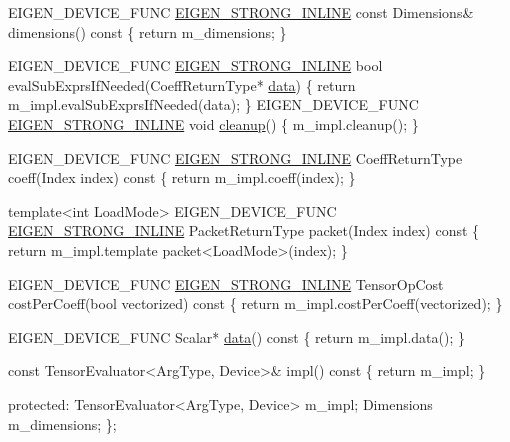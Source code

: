 \begin{DoxyCodeInclude}
  EIGEN\_DEVICE\_FUNC \hyperlink{eigen_2_eigen_2src_2_core_2util_2_macros_8h_af2b60117c00a6e75812de43bfe7db3b1}{EIGEN\_STRONG\_INLINE} \textcolor{keyword}{const} Dimensions& dimensions()\textcolor{keyword}{ const }\{ \textcolor{keywordflow}{return} 
      m\_dimensions; \}

  EIGEN\_DEVICE\_FUNC \hyperlink{eigen_2_eigen_2src_2_core_2util_2_macros_8h_af2b60117c00a6e75812de43bfe7db3b1}{EIGEN\_STRONG\_INLINE} \textcolor{keywordtype}{bool} evalSubExprsIfNeeded(CoeffReturnType* 
      \hyperlink{eigen_2doc_2snippets_2_map__placement__new_8cpp_a0673c926a80474ab7c893cf9a065d0a6}{data}) \{
    \textcolor{keywordflow}{return} m\_impl.evalSubExprsIfNeeded(data);
  \}
  EIGEN\_DEVICE\_FUNC \hyperlink{eigen_2_eigen_2src_2_core_2util_2_macros_8h_af2b60117c00a6e75812de43bfe7db3b1}{EIGEN\_STRONG\_INLINE} \textcolor{keywordtype}{void} \hyperlink{visual__studio_2zlib_2examples_2enough_8c_a0a65638f703cc409774d70ceab9c9c62}{cleanup}() \{
    m\_impl.cleanup();
  \}

  EIGEN\_DEVICE\_FUNC \hyperlink{eigen_2_eigen_2src_2_core_2util_2_macros_8h_af2b60117c00a6e75812de43bfe7db3b1}{EIGEN\_STRONG\_INLINE} CoeffReturnType coeff(Index index)\textcolor{keyword}{ const}
\textcolor{keyword}{  }\{
    \textcolor{keywordflow}{return} m\_impl.coeff(index);
  \}

  \textcolor{keyword}{template}<\textcolor{keywordtype}{int} LoadMode>
  EIGEN\_DEVICE\_FUNC \hyperlink{eigen_2_eigen_2src_2_core_2util_2_macros_8h_af2b60117c00a6e75812de43bfe7db3b1}{EIGEN\_STRONG\_INLINE} PacketReturnType packet(Index index)\textcolor{keyword}{ const}
\textcolor{keyword}{  }\{
    \textcolor{keywordflow}{return} m\_impl.template packet<LoadMode>(index);
  \}

  EIGEN\_DEVICE\_FUNC \hyperlink{eigen_2_eigen_2src_2_core_2util_2_macros_8h_af2b60117c00a6e75812de43bfe7db3b1}{EIGEN\_STRONG\_INLINE} TensorOpCost costPerCoeff(\textcolor{keywordtype}{bool} vectorized)\textcolor{keyword}{ const
       }\{
    \textcolor{keywordflow}{return} m\_impl.costPerCoeff(vectorized);
  \}

  EIGEN\_DEVICE\_FUNC Scalar* \hyperlink{eigen_2doc_2snippets_2_map__placement__new_8cpp_a0673c926a80474ab7c893cf9a065d0a6}{data}()\textcolor{keyword}{ const }\{ \textcolor{keywordflow}{return} m\_impl.data(); \}

  \textcolor{keyword}{const} TensorEvaluator<ArgType, Device>& impl()\textcolor{keyword}{ const }\{ \textcolor{keywordflow}{return} m\_impl; \}

 \textcolor{keyword}{protected}:
  TensorEvaluator<ArgType, Device> m\_impl;
  Dimensions m\_dimensions;
\};



\end{DoxyCodeInclude}
